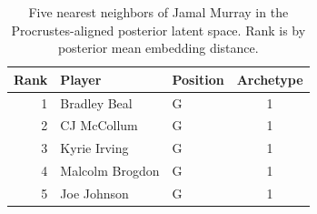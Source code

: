 \begin{table}[htbp]
  \centering\small
  \begin{tabular}{rllc}
    \toprule
    Rank & Player & Position & Archetype \\
    \midrule
    1 & Bradley Beal & G & 1 \\
    2 & CJ McCollum & G & 1 \\
    3 & Kyrie Irving & G & 1 \\
    4 & Malcolm Brogdon & G & 1 \\
    5 & Joe Johnson & G & 1 \\
    \bottomrule
  \end{tabular}
  \caption{Five nearest neighbors of Jamal Murray in the Procrustes-aligned posterior latent space. Rank is by posterior mean embedding distance.}
  \label{tab:Jamal_Murray_neighbors}
\end{table}

